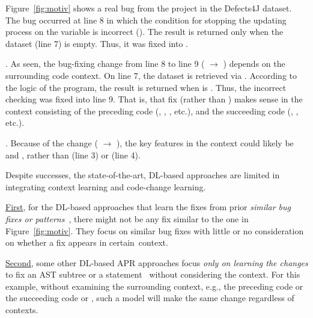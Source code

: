 Figure~\ref{fig:motiv} shows a real bug from the project 
in the Defects4J dataset. The bug occurred at line 8 in which the
condition for stopping the updating process on the 
variable is incorrect (). The result is
returned only when the dataset (line 7) is empty. Thus, it was fixed
into .

. As
seen, the bug-fixing change from line 8 to line 9 ( $\rightarrow$ ) depends on the
surrounding code context. On line 7, the dataset is retrieved via
. According to the logic of the program, the result
is returned when  is .  Thus, the incorrect
checking was fixed into line 9. That is, that fix (rather than
) makes sense in the context consisting of
the preceding code (, ,
, etc.), and the succeeding code
(, , etc.).

\vspace{3pt}
. Because of the change (
$\rightarrow$ ), the key features in the
context could likely be  and ,
rather than  (line 3) or 
(line 4).

Despite successes, the state-of-the-art, DL-based approaches are
limited in integrating context learning and code-change learning.

\underline{First}, for the DL-based approaches that learn the fixes
from prior {\em similar bug fixes or
  patterns}~\cite{gupta2017deepfix,white2019sorting,white2016deep},
there might not be any fix similar to the one in
Figure~\ref{fig:motiv}. They focus on similar bug fixes with little or
no consideration on whether a fix appears in certain~context.

\underline{Second}, some other DL-based APR approaches focus {\em only
  on learning the changes} to fix an AST subtree or a
statement~\cite{chakrabortycodit,see2017get} without considering the
context. For this example, without examining the surrounding context,
e.g., the preceding code  or the succeeding code
 or , such a model will
make the same change regardless of contexts.

